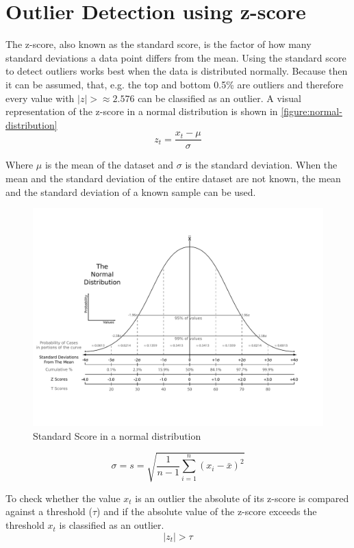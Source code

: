 \section{Outlier Detection using z-score}
\label{section:outlier-detection-z-score}
The z-score, also known as the standard score, is the factor of how many standard deviations a data point differs from the mean. Using the standard score to detect outliers works best when the data is distributed normally. Because then it can be assumed, that, e.g. the top and bottom 0.5\% are outliers and therefore every value with $|z| > \approx 2.576$ can be classified as an outlier. %
A visual representation of the z-score in a normal distribution is shown in \autoref{figure:normal-distribution}
\begin{equation}
  z_t = \frac{x_t - \mu}{\sigma}
\end{equation}

Where $\mu$ is the mean of the dataset and $\sigma$ is the standard deviation. When the mean and the standard deviation of the entire dataset are not known, the mean and the standard deviation of a known sample can be used.
\cite{DetectionSpatialOutlier, teschlSpezielleStetigeVerteilungen2014, rousseeuwAnomalyDetectionRobust2018}
\begin{figure}[H]
  \centering
  \includegraphics[width=\textwidth]{./pics/The_Normal_Distribution.pdf}
  \caption{Standard Score in a normal distribution\cite{StandardScore2022}}
  \label{figure:normal-distribution}
\end{figure}
\begin{equation}
  \sigma = s = \sqrt{\frac{1}{n-1}\sum^n_{i=1}{(x_i - \bar{x})^2}}
\end{equation}
\cite{teschlSpezielleStetigeVerteilungen2014, rousseeuwAnomalyDetectionRobust2018}
\par
To check whether the value $x_t$ is an outlier the absolute of its z-score is compared against a threshold ($\tau$) and if the absolute value of the z-score exceeds the threshold $x_t$ is classified as an outlier.
\begin{equation}
  |z_t| > \tau
\end{equation}
